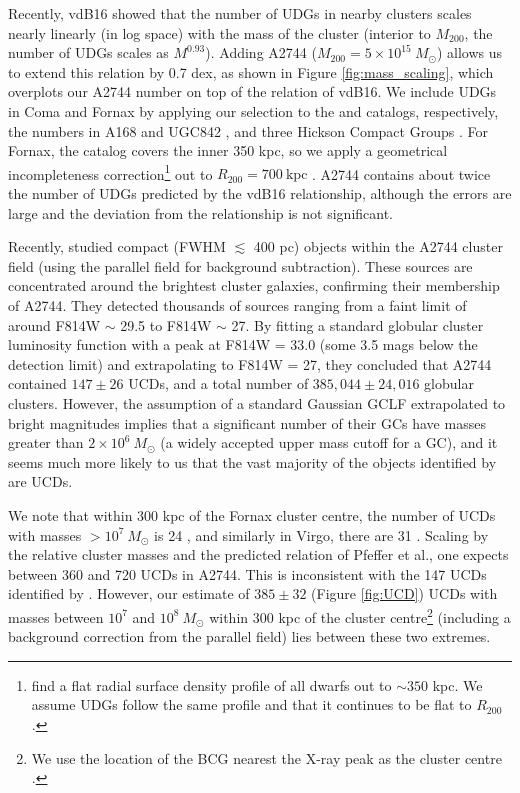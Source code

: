 \documentclass[iop,tighten,twocolumn,apj]{emulateapj}
\begin{document}
Recently, vdB16 showed that the number of UDGs in nearby clusters scales
nearly linearly (in log space) with the mass of the cluster (interior to
$M_{200}$, the number of UDGs scales as $M^{0.93}$).  Adding A2744 ($M_{200} =
5 \times 10^{15}~M_{\odot}$) allows us to extend this relation by 0.7 dex, as
shown in Figure \ref{fig:mass_scaling}, which overplots our A2744 number on
top of the relation of vdB16.  We include UDGs in Coma and Fornax by applying
our selection to the \cite{yagi2016} and \cite{munoz2015} catalogs,
respectively, the numbers in A168 and UGC842 \citep{roman2016a}, and three
Hickson Compact Groups \citep{roman2016b}. For Fornax, the catalog covers the
inner 350 kpc, so we apply a geometrical incompleteness
correction\footnote{\cite{munoz2015} find a flat radial surface density
profile of all dwarfs out to $\sim350$ kpc. We assume UDGs follow the same
profile and that it continues to be flat to $R_{200}$.} out to $R_{200} =
700~\mathrm{kpc}$ \citep{drinkwater2001}.
A2744 contains about twice the number of UDGs predicted by the 
vdB16 relationship, although the errors are large and the deviation from the
relationship is not significant. 

Recently, \cite{lee2016} studied compact (FWHM $\lesssim$ 400 pc) objects within
the A2744 cluster field (using the parallel field for background subtraction).
These sources are concentrated around the brightest cluster galaxies,
confirming their membership of A2744.  They detected thousands of sources
ranging from a faint limit of around F814W $\sim$ 29.5 to F814W $\sim$ 27. By
fitting a standard globular cluster luminosity function with a peak at F814W =
33.0 (some 3.5 mags below the detection limit) and extrapolating to F814W =
27, they concluded that A2744 contained $147 \pm 26$ UCDs, and a total number
of $385,044 \pm 24,016$ globular clusters.  However, the assumption of a
standard Gaussian GCLF extrapolated to bright magnitudes implies that a
significant number of their GCs have masses greater than $2 \times
10^6~M_{\odot}$ (a widely accepted upper mass cutoff for a GC), and it seems
much more likely to us that the vast majority of the objects identified by
\cite{lee2016} are UCDs.

We note that within 300 kpc of the Fornax cluster centre, the number of UCDs
with masses $> 10^7~M_{\odot}$ is 24 \citep{pfeffer2014}, and similarly in
Virgo, there are 31 \citep{zhang2015}. Scaling by the relative cluster masses
and the predicted relation of Pfeffer et al., one expects between 360 and 720
UCDs in A2744.  This is inconsistent with the 147 UCDs identified by
\cite{lee2016}.  However, our estimate of $385 \pm 32$ (Figure \ref{fig:UCD})
UCDs with masses between $10^7$ and $10^8~M_{\odot}$ within 300 kpc of the
cluster centre\footnote{We use the location of the BCG nearest the X-ray peak
as the cluster centre \citep{owers2011}.} (including a background
correction from the parallel field) lies between these two extremes.
\end{document}

